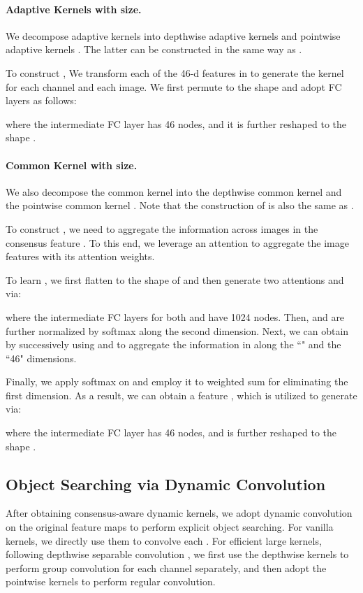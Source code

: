 \documentclass[10pt,twocolumn,letterpaper]{article}
\begin{document}
\vspace{-3mm}
\paragraph{Adaptive Kernels with  size.}
We decompose  adaptive kernels  into depthwise adaptive kernels  and pointwise adaptive kernels . The latter can be constructed in the same way as .

To construct , We transform each of the 46-d features in  to generate the  kernel for each channel and each image. We first permute  to the shape  and adopt FC layers as follows:

where the intermediate FC layer has 46 nodes,  and it is further reshaped to the shape .

\vspace{-3mm}
\paragraph{Common Kernel with  size.}
We also decompose the  common kernel into the depthwise common kernel  and the pointwise common kernel . Note that the construction of  is also the same as .

To construct , we need to aggregate the information across  images in the consensus feature . To this end, we leverage an attention  to aggregate the image features with its  attention weights.

To learn , we first flatten  to the shape of  and then generate two attentions  and  via:

where the intermediate FC layers for both  and  have 1024 nodes.
Then,  and  are further normalized by softmax along the second dimension. Next, we can obtain  by successively using  and  to aggregate the information in  along the ``" and the ``46" dimensions.


Finally, we apply softmax on  and employ it to weighted sum  for eliminating the first dimension. As a result, we can obtain a feature , which is utilized to generate  via:

where the intermediate FC layer has 46 nodes,  and is further reshaped to the shape .

\subsection{Object Searching via Dynamic Convolution}
After obtaining consensus-aware dynamic kernels, we adopt dynamic convolution on the original feature maps  to perform explicit object searching. 
For vanilla  kernels, we directly use them to convolve each . 
For efficient large kernels, following depthwise separable convolution \cite{howard2017mobilenets}, we first use the depthwise kernels to perform  group convolution for each channel separately, and then adopt the pointwise kernels to perform regular  convolution.
\end{document}

